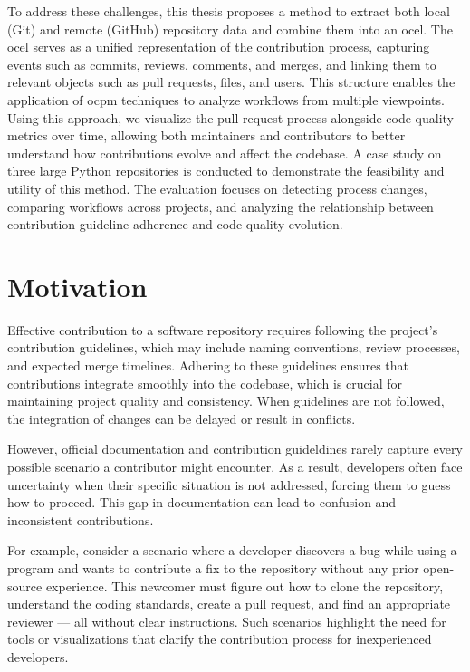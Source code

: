 To address these challenges, this thesis proposes a method to extract both local (Git) and remote (GitHub) repository data and combine them into an \ac{ocel}. The \ac{ocel} serves as a unified representation of the contribution process, capturing events such as commits, reviews, comments, and merges, and linking them to relevant objects such as pull requests, files, and users. This structure enables the application of \ac{ocpm} techniques to analyze workflows from multiple viewpoints. Using this approach, we visualize the pull request process alongside code quality metrics over time, allowing both maintainers and contributors to better understand how contributions evolve and affect the codebase. A case study on three large Python repositories is conducted to demonstrate the feasibility and utility of this method. The evaluation focuses on detecting process changes, comparing workflows across projects, and analyzing the relationship between contribution guideline adherence and code quality evolution.

\section{Motivation}
Effective contribution to a software repository requires following the project’s contribution guidelines, which may include naming conventions, review processes, and expected merge timelines. Adhering to these guidelines ensures that contributions integrate smoothly into the codebase, which is crucial for maintaining project quality and consistency. When guidelines are not followed, the integration of changes can be delayed or result in conflicts.

However, official documentation and contribution guideldines rarely capture every possible scenario a contributor might encounter. As a result, developers often face uncertainty when their specific situation is not addressed, forcing them to guess how to proceed. This gap in documentation can lead to confusion and inconsistent contributions.

For example, consider a scenario where a developer discovers a bug while using a program and wants to contribute a fix to the repository without any prior open-source experience. This newcomer must figure out how to clone the repository, understand the coding standards, create a pull request, and find an appropriate reviewer — all without clear instructions. Such scenarios highlight the need for tools or visualizations that clarify the contribution process for inexperienced developers.

